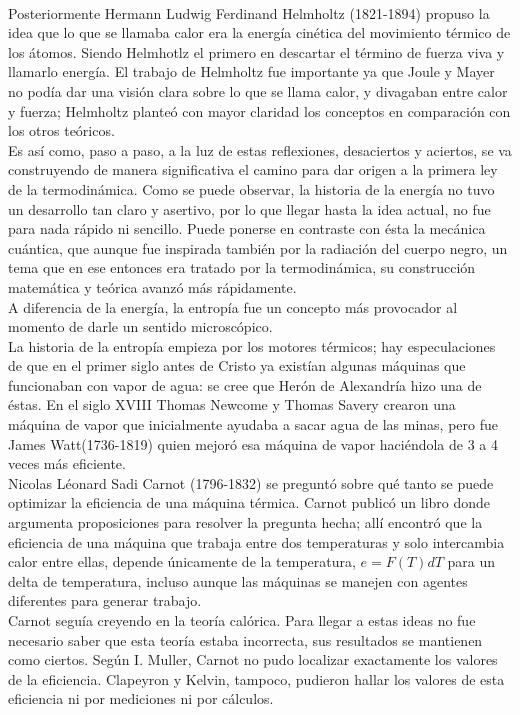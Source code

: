 \\
Posteriormente Hermann Ludwig Ferdinand Helmholtz (1821-1894) propuso la idea que lo que se llamaba calor era la energía cinética del movimiento térmico de los átomos. Siendo Helmhotlz el primero en descartar el término de fuerza viva y llamarlo energía. El trabajo de Helmholtz fue importante ya que Joule y Mayer no podía dar una visión clara sobre lo que se llama calor, y divagaban entre calor y fuerza; Helmholtz planteó con mayor claridad los conceptos en comparación con los otros teóricos.
\\
Es así como, paso a paso, a la luz de estas reflexiones, desaciertos y aciertos, se va construyendo de manera significativa el camino para dar origen a la primera ley de la termodinámica. Como se puede observar, la historia de la energía no tuvo un desarrollo tan claro y asertivo, por lo que llegar hasta la idea actual, no fue para nada rápido ni sencillo. Puede ponerse en contraste con ésta la mecánica cuántica, que aunque fue inspirada también por la radiación del cuerpo negro, un tema que en ese entonces era tratado por la termodinámica, su construcción matemática y teórica avanzó más rápidamente. 
\\
A diferencia de la energía, la entropía fue un concepto más provocador al momento de darle un sentido microscópico. 
\\
La historia de la entropía empieza por los motores térmicos; hay especulaciones de que en el primer siglo antes de Cristo ya existían algunas máquinas que funcionaban con vapor de agua: se cree que Herón de Alexandría hizo una de éstas. En el siglo XVIII Thomas Newcome y Thomas Savery crearon una máquina de vapor que inicialmente ayudaba a sacar agua de las minas, pero fue James Watt(1736-1819) quien mejoró esa máquina de vapor haciéndola de 3 a 4 veces más eficiente.
\\
Nicolas Léonard Sadi Carnot (1796-1832) se preguntó sobre qué tanto se puede optimizar la eficiencia de una máquina térmica. Carnot publicó un libro donde argumenta proposiciones para resolver la pregunta hecha; allí encontró que la eficiencia de una máquina que trabaja entre dos temperaturas y solo intercambia calor entre ellas, depende únicamente de la temperatura, $e=F(T)dT$ para un delta de temperatura, incluso aunque las máquinas se manejen con agentes diferentes para generar trabajo.
\\
Carnot seguía creyendo en la teoría calórica. Para llegar a estas ideas no fue necesario saber que esta teoría estaba incorrecta, sus resultados se mantienen como ciertos. Según I. Muller, Carnot no pudo localizar exactamente los valores de la eficiencia. Clapeyron y Kelvin, tampoco, pudieron hallar los valores de esta eficiencia ni por mediciones ni por cálculos.

